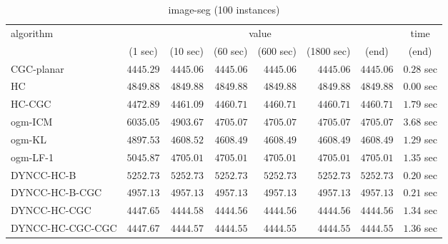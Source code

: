 \begin{table}[H]
\tiny
\centering
\caption{image-seg (100 instances)}
\label{tab:anytimetable-image-seg}
\begin{tabular}{lrrrrrrr}
\toprule
           algorithm &                                   \multicolumn{6}{c}{value} & \multicolumn{1}{c}{time}   \\  
\cmidrule(lr){2-7}\cmidrule(lr){8-8}  
                     & \multicolumn{1}{c}{(1 sec)} & \multicolumn{1}{c}{(10 sec)} & \multicolumn{1}{c}{(60 sec)} & \multicolumn{1}{c}{(600 sec)} & \multicolumn{1}{c}{(1800 sec)} & \multicolumn{1}{c}{(end)} & \multicolumn{1}{c}{(end)}   \\ \midrule 
          CGC-planar & $      4445.29$ & $      4445.06$ & $      4445.06$ & $      4445.06$ & $      4445.06$ & $      4445.06$ & $         0.28$ sec   \\ 
                  HC & $      4849.88$ & $      4849.88$ & $      4849.88$ & $      4849.88$ & $      4849.88$ & $      4849.88$ & $         0.00$ sec   \\ 
              HC-CGC & $      4472.89$ & $      4461.09$ & $      4460.71$ & $      4460.71$ & $      4460.71$ & $      4460.71$ & $         1.79$ sec   \\ 
             ogm-ICM & $      6035.05$ & $      4903.67$ & $      4705.07$ & $      4705.07$ & $      4705.07$ & $      4705.07$ & $         3.68$ sec   \\ 
              ogm-KL & $      4897.53$ & $      4608.52$ & $      4608.49$ & $      4608.49$ & $      4608.49$ & $      4608.49$ & $         1.29$ sec   \\ 
            ogm-LF-1 & $      5045.87$ & $      4705.01$ & $      4705.01$ & $      4705.01$ & $      4705.01$ & $      4705.01$ & $         1.35$ sec   \\ 
          DYNCC-HC-B & $      5252.73$ & $      5252.73$ & $      5252.73$ & $      5252.73$ & $      5252.73$ & $      5252.73$ & $         0.20$ sec   \\ 
      DYNCC-HC-B-CGC & $      4957.13$ & $      4957.13$ & $      4957.13$ & $      4957.13$ & $      4957.13$ & $      4957.13$ & $         0.21$ sec   \\ 
        DYNCC-HC-CGC & $      4447.65$ & $      4444.58$ & $      4444.56$ & $      4444.56$ & $      4444.56$ & $      4444.56$ & $         1.34$ sec   \\ 
    DYNCC-HC-CGC-CGC & $      4447.67$ & $      4444.57$ & $      4444.55$ & $      4444.55$ & $      4444.55$ & $      4444.55$ & $         1.36$ sec   \\ 

\end{tabular}
\end{table}
